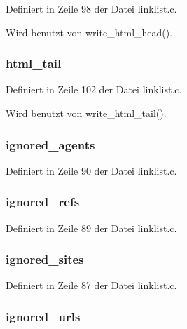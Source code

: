 Definiert in Zeile 98 der Datei linklist.c.

Wird benutzt von write\_\-html\_\-head().
\subsubsection{ {\bf html\_\-tail}}\label{linklist_8h_7d3b981f0cda9084a93c191ab80637da}




Definiert in Zeile 102 der Datei linklist.c.

Wird benutzt von write\_\-html\_\-tail().
\subsubsection{ {\bf ignored\_\-agents}}\label{linklist_8h_60013ce10d008e9eb74a4b6f28959729}




Definiert in Zeile 90 der Datei linklist.c.
\subsubsection{ {\bf ignored\_\-refs}}\label{linklist_8h_761639dc29cca53d524007b9fb4a6e65}




Definiert in Zeile 89 der Datei linklist.c.
\subsubsection{ {\bf ignored\_\-sites}}\label{linklist_8h_9df089ae5b8931353b2e79b9a33c70e6}




Definiert in Zeile 87 der Datei linklist.c.
\subsubsection{ {\bf ignored\_\-urls}}\label{linklist_8h_9a30b4cfe3e814caad5864bf70683264}




